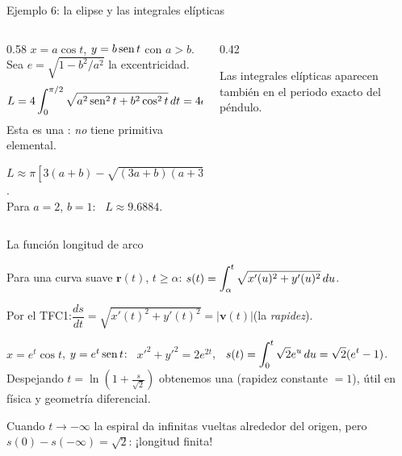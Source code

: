 \documentclass[10pt,aspectratio=169]{beamer}
\begin{document}
\begin{frame}{Ejemplo 6: la elipse y las integrales elípticas}
  \begin{columns}
    \begin{column}{0.58\textwidth}
      $x=a\cos t$, $y=b\operatorname{sen} t$ con $a>b$. Sea $e=\sqrt{1-b^2/a^2}$ la excentricidad.
      \[ L=4\int_0^{\pi/2}\sqrt{a^2\operatorname{sen}^2t+b^2\cos^2t}\,dt=4a\int_0^{\pi/2}\sqrt{1-e^2\cos^2t}\,dt. \]
      Esta es una : \emph{no} tiene primitiva elemental.
      \begin{observacion}
        $L\approx\pi\left[3(a+b)-\sqrt{(3a+b)(a+3b)}\right]$.\\
        Para $a=2$, $b=1$: \ $L\approx9.6884$.
      \end{observacion}
    \end{column}
    \begin{column}{0.42\textwidth}
      \centering

      \small Las integrales elípticas aparecen también en el periodo exacto del péndulo.
    \end{column}
  \end{columns}
\end{frame}

\begin{frame}{La función longitud de arco}
  \begin{definicion}
    Para una curva suave $\mathbf r(t)$, $t\ge\alpha$:\qquad
    $\displaystyle s(t)=\int_\alpha^t\sqrt{x'(u)^2+y'(u)^2}\,du$.
  \end{definicion}
  Por el TFC1:\qquad $\dfrac{ds}{dt}=\sqrt{x'(t)^2+y'(t)^2}=|\mathbf v(t)|$\quad (la \emph{rapidez}).
  \begin{ejemplo}
    $x=e^t\cos t$, $y=e^t\operatorname{sen} t$: \ $x'^2+y'^2=2e^{2t}$, \ $s(t)=\displaystyle\int_0^t\sqrt2e^u\,du=\sqrt2(e^t-1)$.\\[1mm]
    Despejando $t=\ln\!\left(1+\frac{s}{\sqrt2}\right)$ obtenemos una 
    (rapidez constante $=1$), útil en física y geometría diferencial.
  \end{ejemplo}
  \begin{observacion}
    Cuando $t\to-\infty$ la espiral da infinitas vueltas alrededor del origen, pero $s(0)-s(-\infty)=\sqrt2$: ¡longitud finita!
  \end{observacion}
\end{frame}
\end{document}
